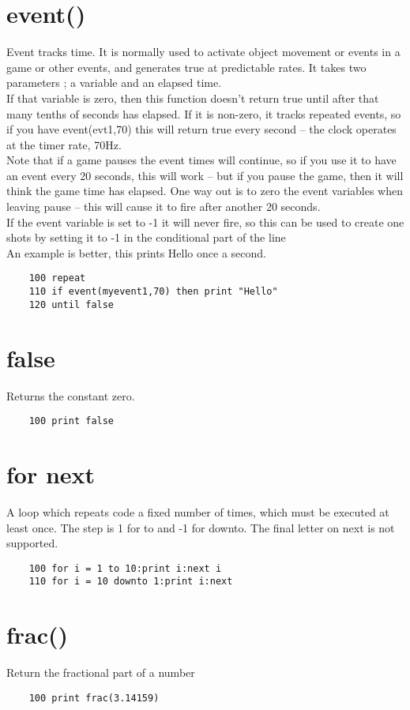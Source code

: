 \section*{event()}
Event tracks time. It is normally used to activate object movement or events in a game or other events, and generates true at predictable rates. It takes two parameters ; a variable and an elapsed time.\\
If that variable is zero, then this function doesn’t return true until after that many tenths of seconds has elapsed. If it is non-zero, it tracks repeated events, so if you have event(evt1,70) this will return true every second – the clock operates at the timer rate, 70Hz.\\
Note that if a game pauses the event times will continue, so if you use it to have an event every 20 seconds, this will work – but if you pause the game, then it will think the game time has elapsed. One way out is to zero the event variables when leaving pause – this will cause it to fire after another 20 seconds. \\
If the event variable is set to -1 it will never fire, so this can be used to create one shots by setting it to -1 in the conditional part of the line\\
An example is better, this prints Hello once a second.
\example{}
\begin{verbatim}
	100 repeat
	110 if event(myevent1,70) then print "Hello"
	120 until false
\end{verbatim}

\section*{false}
Returns the constant zero.
\example{}
\begin{verbatim}
	100 print false
\end{verbatim}

\section*{for next}
A loop which repeats code a fixed number of times, which must be executed at least once. The step is 1 for to and -1 for downto. The final letter on next is not supported.
\example{}
\begin{verbatim}
	100 for i = 1 to 10:print i:next i
	110 for i = 10 downto 1:print i:next
\end{verbatim}

\section*{frac()}
Return the fractional part of a number
\example{}
\begin{verbatim}
	100 print frac(3.14159)
\end{verbatim}

